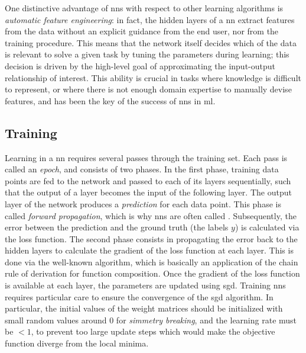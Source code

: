 One distinctive advantage of \glspl{nn} with respect to other learning algorithms is \emph{automatic feature engineering}: in fact, the hidden layers of a \gls{nn} extract features from the data without an explicit guidance from the end user, nor from the training procedure. This means that the network itself decides which  of the data is relevant to solve a given task by tuning the parameters during learning; this decision is driven by the high-level goal of approximating the input-output relationship of interest. This ability is crucial in tasks where knowledge is difficult to represent, or where there is not enough domain expertise to manually devise features, and has been the key of the success of \glspl{nn} in \gls{ml}.

\subsection{Training}\label{sec:training}
Learning in a \gls{nn} requires several passes through the training set. Each pass is called an \emph{epoch}, and consists of two phases. In the first phase, training data points are fed to the network and passed to each of its layers sequentially, such that the output of a layer becomes the input of the following layer. The output layer of the network produces a \emph{prediction}
for each data point. This phase is called \emph{forward propagation}, which is why \glspl{nn} are often called . Subsequently, the error between the prediction and the ground truth (the labels $y$) is calculated via the loss function. The second phase consists in propagating the error back to the hidden layers to calculate the gradient of the loss function at each layer. This is done via the well-known  algorithm, which is basically an application of the chain rule of derivation for function composition. Once the gradient of the loss function is available at each layer, the parameters are updated using \gls{sgd}.
Training \glspl{nn} requires particular care to ensure the convergence of the \gls{sgd} algorithm. In particular, the initial values of the weight matrices should be initialized with small random values around 0 for \emph{simmetry breaking}, and the learning rate must be $< 1$, to prevent too large update steps which would make the objective function diverge from the local minima.

